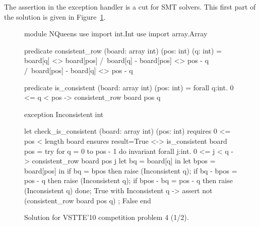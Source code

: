 The assertion in the exception handler is a cut for SMT solvers.
This first part of the solution is given in Figure~\ref{fig:NQueens1}.
\begin{figure}
  \centering
\begin{whycode}
module NQueens
  use import int.Int
  use import array.Array

  predicate consistent_row (board: array int) (pos: int) (q: int) =
    board[q] <> board[pos] /\
    board[q] - board[pos] <> pos - q /\
    board[pos] - board[q] <> pos - q

  predicate is_consistent (board: array int) (pos: int) =
    forall q:int. 0 <= q < pos -> consistent_row board pos q

  exception Inconsistent int

  let check_is_consistent (board: array int) (pos: int)
    requires { 0 <= pos < length board }
    ensures  { result=True <-> is_consistent board pos }
  = try
      for q = 0 to pos - 1 do
        invariant {
          forall j:int. 0 <= j < q -> consistent_row board pos j
        }
        let bq   = board[q]   in
        let bpos = board[pos] in
        if bq        = bpos    then raise (Inconsistent q);
        if bq - bpos = pos - q then raise (Inconsistent q);
        if bpos - bq = pos - q then raise (Inconsistent q)
      done;
      True
    with Inconsistent q ->
      assert { not (consistent_row board pos q) };
      False
    end
\end{whycode}
\vspace*{-1em}%
  \caption{Solution for VSTTE'10 competition problem 4 (1/2).}
  \label{fig:NQueens1}
\end{figure}

